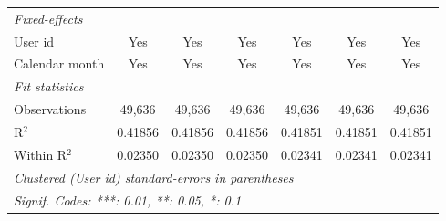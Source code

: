 \begin{table}[htbp]
\begin{footnotesize}
\begin{tabular}{lcccccc}
         \midrule \emph{Fixed-effects} &   &   &   &   &   &  \\
         User id             & Yes            & Yes            & Yes            & Yes            & Yes            & Yes\\
         Calendar month      & Yes            & Yes            & Yes            & Yes            & Yes            & Yes\\
         \midrule \emph{Fit statistics} &   &   &   &   &   &  \\
         Observations        & 49,636         & 49,636         & 49,636         & 49,636         & 49,636         & 49,636\\
         R$^2$               & 0.41856        & 0.41856        & 0.41856        & 0.41851        & 0.41851        & 0.41851\\
         Within R$^2$        & 0.02350        & 0.02350        & 0.02350        & 0.02341        & 0.02341        & 0.02341\\
         \midrule\midrule\multicolumn{7}{l}{\emph{Clustered (User id) standard-errors in parentheses}}\\
         \multicolumn{7}{l}{\emph{Signif. Codes: ***: 0.01, **: 0.05, *: 0.1}}\\
      \end{tabular}
   \end{footnotesize}
\end{table}


